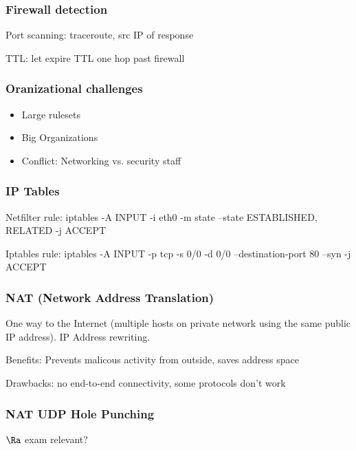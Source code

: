 \documentclass[fs, footer]{latex4ei}
\begin{document}
\begin{multicols*}{4}
{ \subsubsection{Firewall detection}

 Port scanning: traceroute, src IP of response

 TTL:  let expire TTL one hop past firewall

 \subsubsection{Oranizational challenges}
 \begin{itemize}
  	\item Large rulesets
  	\item Big Organizations
  	\item Conflict: Networking vs. security staff
  \end{itemize}

  \subsubsection{IP Tables}
	Netfilter rule:
	iptables -A INPUT -i eth0 -m state --state ESTABLISHED, RELATED -j ACCEPT

	Iptables rule:  iptables -A INPUT -p tcp -s 0/0 -d 0/0 --destination-port 80 --syn -j ACCEPT

	\subsubsection{NAT (Network Address Translation)}
	One way to the Internet (multiple hosts on private network using the same public IP address). IP Address rewriting.

	Benefits: Prevents malicous activity from outside, saves address space

	Drawbacks: no end-to-end connectivity, some protocols don't work

	\subsubsection{NAT UDP Hole Punching}

	$\Ra$ exam relevant?
}
\end{multicols*}
\end{document}
